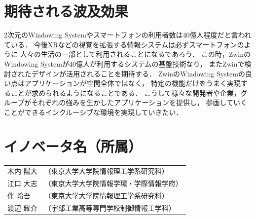 \documentclass[12pt,a4paper]{jsarticle}
\begin{document}
\section{期待される波及効果}

2次元のWindowing Systemやスマートフォンの利用者数は40億人程度だと言われている．
今後XRなどの視覚を拡張する情報システムは必ずスマートフォンのように
人々の生活の一部として利用されることになるであろう．
この時，ZwinのWindowing Systemが40億人が利用するシステムの基盤技術なり，
またZwinで検討されたデザインが活用されることを期待する．
ZwinのWindowing Systemの良い点はアプリケーションが空間全体ではなく，
特定の機能だけをうまく実現することが求められるようになることである．
こうして様々な開発者や企業，グループがそれぞれの強みを生かしたアプリケーションを提供し，
参画していくことができるインクルーシブな環境を実現していきたい．

\section{イノベータ名（所属）}
\begin{table}[h]
  \begin{tabular}{ll}
    木内 陽大 & （東京大学大学院情報理工学系研究科）     \\
    江口 大志 & （東京大学大学院情報学環・学際情報学府） \\
    伴 玲吾   & （東京大学大学院情報理工学系研究科）     \\
    渡辺 耀介 & （宇部工業高等専門学校制御情報工学科）   \\
  \end{tabular}
\end{table}
\end{document}

